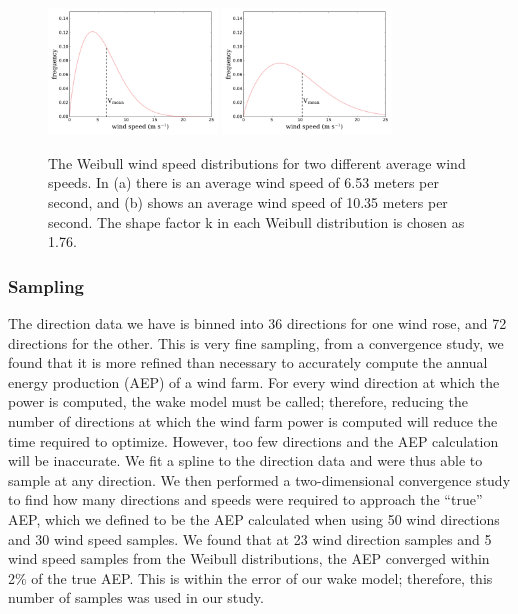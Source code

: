 \begin{figure}[htbp]
  \centering
  \includegraphics[width=0.4\textwidth]{Figures/weibull_6_53.pdf}\label{653}
  \includegraphics[width=0.4\textwidth]{Figures/weibull_10_35.pdf}\label{1035}
  \caption{\label{weibull} The Weibull wind speed distributions for two different average wind speeds. In (a) there is an average wind speed of 6.53 meters per second, and (b) shows an average wind speed of 10.35 meters per second. The shape factor k in each Weibull distribution is chosen as 1.76.}
\end{figure}


\subsubsection{Sampling}
The direction data we have is binned into 36 directions for one wind rose, and 72 directions for the other. This is very fine sampling,
from a convergence study, we found that it is more refined than necessary to accurately compute the annual energy production (AEP) of a wind farm. 
For every wind direction at which the power is computed, the wake model must be called; therefore, reducing the number of directions at which the wind farm power is computed will reduce the time required to optimize. 
However, too few directions and the AEP calculation will be inaccurate. We fit a spline to the direction data and were thus able to sample at any direction. We then performed a two-dimensional convergence study to find how many directions and speeds were required to approach the ``true'' AEP, which we defined to be the AEP calculated when using 50 wind directions and 30 wind speed samples. 
We found that at 23 wind direction samples and 5 wind speed samples from the Weibull distributions, the AEP converged within 2\% of the true AEP. This is within the error of our wake model; therefore, this number of samples was used in our study. 